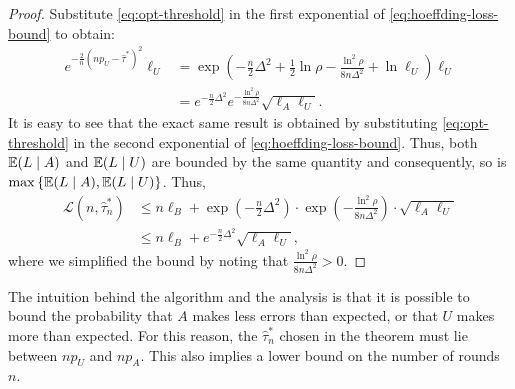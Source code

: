 \documentclass[a4paper]{article}
\newenvironment{IEEEproof}{\begin{proof}}{\end{proof}}
\newcommand \techreport[1]{#1}
\newcommand \ELb {\mathcal{L}}
\newcommand\E{\mathop{\mbox{\ensuremath{\mathbb{E}}}}\nolimits}
\newcommand \thr {\tau}
\newcommand \hthr {\hat{\thr}_n^*}
\newcommand \loss {L}
\newcommand \pa {p_A}
\newcommand \pu {p_U}
\newcommand \LA {\ell_A}
\newcommand \LU {\ell_U}
\newcommand \LB {\ell_B}
\theoremstyle{plain} \newtheorem{remark}{Remark}
\theoremstyle{plain} \newtheorem{definition}{Definition}
\theoremstyle{plain} \newtheorem{example}{Example}
\theoremstyle{plain} \newtheorem{assumption}{Assumption}
\theoremstyle{plain} \newtheorem{conjecture}{Conjecture}
\theoremstyle{plain} \newtheorem{theorem}{Theorem}
\theoremstyle{plain} \newtheorem{proposition}{Proposition}
\theoremstyle{plain} \newtheorem{lemma}{Lemma}
\theoremstyle{plain} \newtheorem{corollary}{Corollary}
\begin{document}
\begin{IEEEproof}
  Substitute \eqref{eq:opt-threshold} in
  the first exponential of \eqref{eq:hoeffding-loss-bound} to obtain:
  \begin{align*}
    e^{-\frac{2}{n}(n\pu - \hat{\tau}^*)^2} \LU
\techreport{
  &=
  \exp\left(
    -\frac{n}{2}\Delta^2 + \frac{1}{2} \ln \rho - \frac{\ln^2\rho}{8n\Delta^2} + \ln \LU
  \right) \LU
  \\}
&=
e^{-\frac{n}{2}\Delta^2} e^{-\frac{\ln^2\rho}{8n\Delta^2}} \sqrt{\LA\LU}.
\end{align*}
  It is easy to see that the exact same result is obtained by
  substituting \eqref{eq:opt-threshold} in the second exponential of \eqref{eq:hoeffding-loss-bound}.
Thus, both
  $\E(\loss \mid A)$ and $\E(\loss \mid U)$ are bounded by the same
  quantity and consequently, so is $\max\left\{\E(\loss \mid A),
    \E(\loss\mid U)\right\}$. Thus,
  \begin{align*}
    \ELb(n, \hthr)
    &\leq
    \techreport{n\LB + \exp\left(-\frac{n}{2}\Delta^2\right) \cdot \exp\left(-\frac{\ln^2\rho}{8n\Delta^2}\right) \cdot \sqrt{\LA \LU}
    \\
    &\leq}
    n\LB + 
    e^{-\frac{n}{2}\Delta^2} \sqrt{\LA \LU},
\end{align*}
  where we simplified the bound by noting that
  $\frac{\ln^2\rho}{8n\Delta^2} > 0$.
\end{IEEEproof}
The intuition behind the algorithm and the analysis is that it is
possible to bound the probability that $A$ makes less errors than
expected, or that $U$ makes more than expected.  For this reason, the
$\hthr$ chosen in the theorem must lie between $n\pu$ and $n\pa$. This
also implies a lower bound on the number of rounds $n$.  
\end{document}
